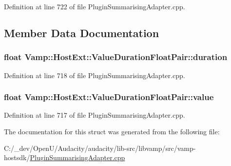 Definition at line 722 of file Plugin\+Summarising\+Adapter.\+cpp.



\subsection{Member Data Documentation}
\subsubsection[{\texorpdfstring{duration}{duration}}]{\setlength{\rightskip}{0pt plus 5cm}float Vamp\+::\+Host\+Ext\+::\+Value\+Duration\+Float\+Pair\+::duration}\hypertarget{struct_vamp_1_1_host_ext_1_1_value_duration_float_pair_a4ad4ef7240e419036ee3fd91db579fea}{}\label{struct_vamp_1_1_host_ext_1_1_value_duration_float_pair_a4ad4ef7240e419036ee3fd91db579fea}


Definition at line 718 of file Plugin\+Summarising\+Adapter.\+cpp.

\subsubsection[{\texorpdfstring{value}{value}}]{\setlength{\rightskip}{0pt plus 5cm}float Vamp\+::\+Host\+Ext\+::\+Value\+Duration\+Float\+Pair\+::value}\hypertarget{struct_vamp_1_1_host_ext_1_1_value_duration_float_pair_a3e2e0e9012e5bf2139b32df0a3464451}{}\label{struct_vamp_1_1_host_ext_1_1_value_duration_float_pair_a3e2e0e9012e5bf2139b32df0a3464451}


Definition at line 717 of file Plugin\+Summarising\+Adapter.\+cpp.



The documentation for this struct was generated from the following file\+:\begin{DoxyCompactItemize}
\item 
C\+:/\+\_\+dev/\+Open\+U/\+Audacity/audacity/lib-\/src/libvamp/src/vamp-\/hostsdk/\hyperlink{_plugin_summarising_adapter_8cpp}{Plugin\+Summarising\+Adapter.\+cpp}\end{DoxyCompactItemize}
